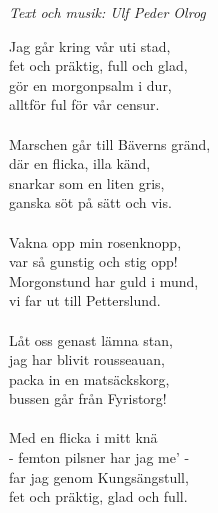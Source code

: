 {\footnotesize\textit{Text och musik: Ulf Peder Olrog}}\par
\vspace{10pt}
Jag går kring vår uti stad,\\
fet och präktig, full och glad,\\
gör en morgonpsalm i dur,\\
alltför ful för vår censur.\\
\\
Marschen går till Bäverns gränd,\\
där en flicka, illa känd,\\
snarkar som en liten gris,\\
ganska söt på sätt och vis.\\
\\
Vakna opp min rosenknopp,\\
var så gunstig och stig opp!\\
Morgonstund har guld i mund,\\
vi far ut till Petterslund.\\
\\
Låt oss genast lämna stan,\\
jag har blivit rousseauan,\\
packa in en matsäckskorg,\\
bussen går från Fyristorg!\\
\\
Med en flicka i mitt knä\\
- femton pilsner har jag me’ -\\
far jag genom Kungsängstull,\\
fet och präktig, glad och full.
